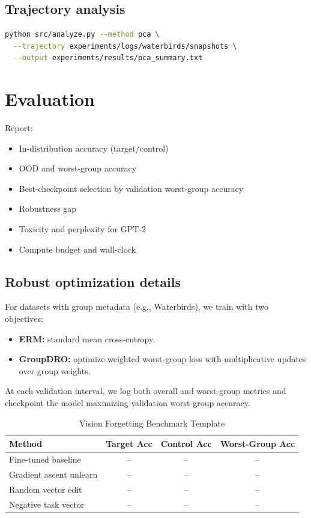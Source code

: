 \documentclass[11pt]{article}
\begin{document}
\subsection{Trajectory analysis}
\begin{lstlisting}[language=bash]
python src/analyze.py --method pca \
  --trajectory experiments/logs/waterbirds/snapshots \
  --output experiments/results/pca_summary.txt
\end{lstlisting}

\section{Evaluation}
Report:
\begin{itemize}[leftmargin=*]
  \item In-distribution accuracy (target/control)
  \item OOD and worst-group accuracy
  \item Best-checkpoint selection by validation worst-group accuracy
  \item Robustness gap
  \item Toxicity and perplexity for GPT-2
  \item Compute budget and wall-clock
\end{itemize}

\subsection{Robust optimization details}
For datasets with group metadata (e.g., Waterbirds), we train with two objectives:
\begin{itemize}[leftmargin=*]
  \item \textbf{ERM:} standard mean cross-entropy.
  \item \textbf{GroupDRO:} optimize weighted worst-group loss with multiplicative updates over group weights.
\end{itemize}
At each validation interval, we log both overall and worst-group metrics and checkpoint the model maximizing validation worst-group accuracy.

\begin{table}[H]
\centering
\caption{Vision Forgetting Benchmark Template}
\begin{tabular}{lccc}
\toprule
Method & Target Acc & Control Acc & Worst-Group Acc \\
\midrule
Fine-tuned baseline & -- & -- & -- \\
Gradient ascent unlearn & -- & -- & -- \\
Random vector edit & -- & -- & -- \\
Negative task vector & -- & -- & -- \\
\bottomrule
\end{tabular}
\end{table}
\end{document}
